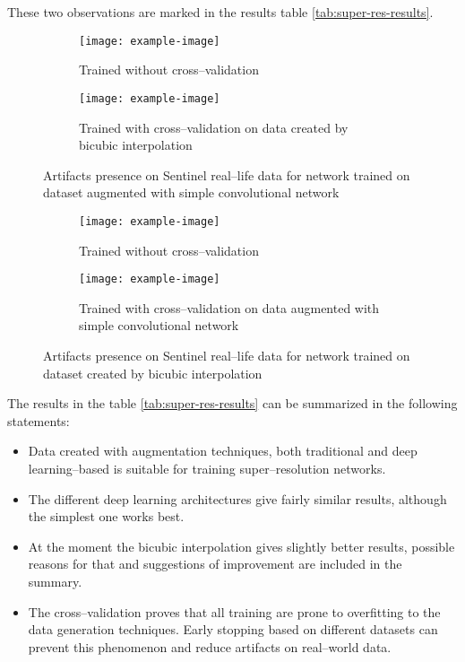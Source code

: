 These two observations are marked in the results table \ref{tab:super-res-results}.
\begin{figure}
    \begin{subfigure}[t]{0.45\textwidth}
        \centering
        \texttt{[image: example-image]}
        \caption{Trained without cross--validation}
    \end{subfigure}
    \hfill
    \begin{subfigure}[t]{0.45\textwidth}
        \centering
        \texttt{[image: example-image]}
        \caption{Trained with cross--validation on data created by bicubic interpolation}
    \end{subfigure}
    \caption{Artifacts presence on Sentinel real--life data for network trained on dataset augmented with simple convolutional network}
    \label{fig:sentinel-2-real-artifacts-simple-conv}
\end{figure}
\begin{figure}
    \begin{subfigure}[t]{0.45\textwidth}
        \centering
        \texttt{[image: example-image]}
        \caption{Trained without cross--validation}
    \end{subfigure}
    \hfill
    \begin{subfigure}[t]{0.45\textwidth}
        \centering
        \texttt{[image: example-image]}
        \caption{Trained with cross--validation on data augmented with simple convolutional network}
    \end{subfigure}
    \caption{Artifacts presence on Sentinel real--life data for network trained on dataset created by bicubic interpolation}
    \label{fig:sentinel-2-real-artifacts-bicubic}
\end{figure}

The results in the table \ref{tab:super-res-results} can be summarized in the following statements:
\begin{itemize}
	\item Data created with augmentation techniques, both traditional and deep learning--based is suitable for training super--resolution networks.
	\item The different deep learning architectures give fairly similar results, although the simplest one works best.
	\item At the moment the bicubic interpolation gives slightly better results, possible reasons for that and suggestions of improvement are included in the summary.
	\item The cross--validation proves that all training are prone to overfitting to the data generation techniques. Early stopping based on different datasets can prevent this phenomenon and reduce artifacts on real--world data.
\end{itemize}